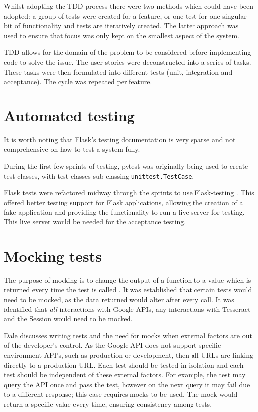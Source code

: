 Whilst adopting the TDD process there were two methods which could have been adopted:  a group of tests were created for a feature, or one test for one singular bit of functionality and tests are iteratively created. The latter approach was used to ensure that focus was only kept on the smallest aspect of the system.


TDD allows for the domain of the problem to be considered before implementing code to solve the issue. The user stories were deconstructed into a series of tasks. These tasks were then formulated into different tests (unit, integration and acceptance). The cycle was repeated per feature.

\section{Automated testing}
It is worth noting that Flask's testing documentation is very sparse and not comprehensive on how to test a system fully.

During the first few sprints of testing, pytest \cite{citeulike:14020583} was originally being used to create test classes, with test classes sub-classing  \texttt{unittest.TestCase}.

Flask tests were refactored midway through the sprints to use Flask-testing \cite{citeulike:14020588}. This offered better testing support for Flask applications, allowing the creation of a fake application and providing the functionality to run a live server for testing. This live server would be needed for the acceptance testing.

\section{Mocking tests}
The purpose of mocking is to change the output of a function to a value which is returned every time the test is called \cite{citeulike:14020596}. It was established that certain tests would need to be mocked, as the data returned would alter after every call. It was identified that \textit{all} interactions with Google APIs, any interactions with Tesseract and the Session would need to be mocked.

Dale \cite{citeulike:14020597} discusses writing tests and the need for mocks when external factors are out of the developer's control. As the Google API does not support specific environment API's, such as production or development, then all URLs are linking directly to a production URL. Each test should be tested in isolation and each test should be independent of these external factors. For example, the test may query the API once and pass the test, however on the next query it may fail due to a different response; this case requires mocks to be used. The mock would return a specific value every time, ensuring consistency among tests.

